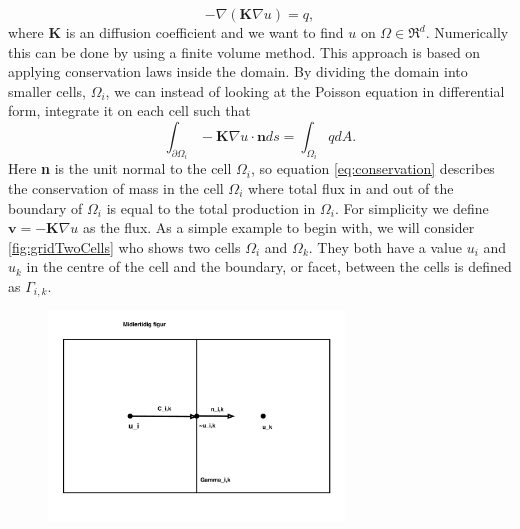 \begin{equation}
    -\nabla(\textbf{K}\nabla u) = q,
    \label{eq:Poisson}
\end{equation}
where \textbf{K} is an diffusion coefficient and we want to find $u$ on $\Omega \in \Re^d$. Numerically this can be done by using a finite volume method. This approach is based on applying conservation laws inside the domain. By dividing the domain into smaller cells, $\Omega_i$, we can instead of looking at the Poisson equation in differential form, integrate it on each cell such that
\begin{equation}
    \int_{\partial\Omega_i} - \textbf{K} \nabla u \cdot \textbf{n} ds = \int_{\Omega_i} q dA.
    \label{eq:conservation}
\end{equation}
Here \textbf{n} is the unit normal to the cell $\Omega_i$, so equation \eqref{eq:conservation} describes the conservation of mass in the cell $\Omega_i$ where total flux in and out of the boundary of $\Omega_i$ is equal to the total production in $\Omega_i$. For simplicity we define $\textbf{v} = - \textbf{K} \nabla u$ as the flux. As a simple example to begin with, we will consider \autoref{fig:gridTwoCells} who shows two cells $\Omega_i$ and $\Omega_k$. They both have a value $u_i$ and $u_k$ in the centre of the cell and the boundary, or facet, between the cells is defined as $\Gamma_{i,k}$.
\begin{figure}[htb]
    \centering
    \includegraphics[width = 0.7\textwidth]{figures/grid_two_cells.pdf}
    \caption{}
    \label{fig:gridTwoCells}
\end{figure}

